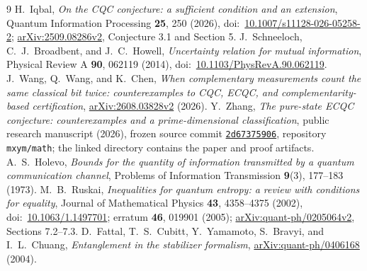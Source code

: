 \documentclass[11pt]{article}
\theoremstyle{remark}\newtheorem{remark}[theorem]{Remark}
\begin{document}
\begin{thebibliography}{9}
H.~Iqbal, \emph{On the CQC conjecture: a sufficient condition and an extension}, Quantum Information Processing \textbf{25}, 250 (2026), doi:~\href{https://doi.org/10.1007/s11128-026-05258-2}{10.1007/s11128-026-05258-2}; \href{https://arxiv.org/abs/2509.08286v2}{arXiv:2509.08286v2}, Conjecture 3.1 and Section 5.
J.~Schneeloch, C.~J.~Broadbent, and J.~C.~Howell, \emph{Uncertainty relation for mutual information}, Physical Review A \textbf{90}, 062119 (2014), doi:~\href{https://doi.org/10.1103/PhysRevA.90.062119}{10.1103/PhysRevA.90.062119}.
J.~Wang, Q.~Wang, and K.~Chen, \emph{When complementary measurements count the same classical bit twice: counterexamples to CQC, ECQC, and complementarity-based certification}, \href{https://arxiv.org/abs/2608.03828v2}{arXiv:2608.03828v2} (2026).
Y.~Zhang, \emph{The pure-state ECQC conjecture: counterexamples and a prime-dimensional classification}, public research manuscript (2026), frozen source commit \href{https://github.com/mxym/math/tree/2d67375906d729862d4eb085186a5fd5670ef390/research/ecqc-pure-state-counterexamples}{\texttt{2d67375906}}, repository \texttt{mxym/math}; the linked directory contains the paper and proof artifacts.
A.~S.~Holevo, \emph{Bounds for the quantity of information transmitted by a quantum communication channel}, Problems of Information Transmission \textbf{9}(3), 177--183 (1973).
M.~B.~Ruskai, \emph{Inequalities for quantum entropy: a review with conditions for equality}, Journal of Mathematical Physics \textbf{43}, 4358--4375 (2002), doi:~\href{https://doi.org/10.1063/1.1497701}{10.1063/1.1497701}; erratum \textbf{46}, 019901 (2005); \href{https://arxiv.org/abs/quant-ph/0205064v2}{arXiv:quant-ph/0205064v2}, Sections 7.2--7.3.
D.~Fattal, T.~S.~Cubitt, Y.~Yamamoto, S.~Bravyi, and I.~L.~Chuang, \emph{Entanglement in the stabilizer formalism}, \href{https://arxiv.org/abs/quant-ph/0406168}{arXiv:quant-ph/0406168} (2004).
\end{thebibliography}
\end{document}
